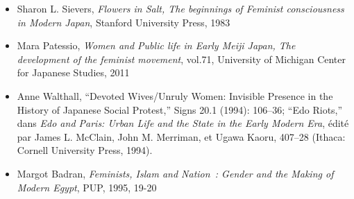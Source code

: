 \documentclass[11pt,a4paper]{article}
\begin{document}
\begin{itemize}[leftmargin=1.3em,itemsep=.18em,topsep=.25em]
\item
  Sharon L. Sievers, \emph{Flowers in Salt, The beginnings of Feminist consciousness in Modern Japan}, Stanford University Press, 1983
\item
  Mara Patessio, \emph{Women and Public life in Early Meiji Japan, The development of the feminist movement}, vol.71, University of Michigan Center for Japanese Studies, 2011
\item
  Anne Walthall, “Devoted Wives/Unruly Women: Invisible Presence in the History of Japanese Social Protest,” Signs 20.1 (1994): 106–36; “Edo Riots,” dans \emph{Edo and Paris: Urban Life and the State in the Early Modern Era}, édité par James L. McClain, John M. Merriman, et Ugawa Kaoru, 407–28 (Ithaca: Cornell University Press, 1994).
\item
  Margot Badran, \emph{Feminists, Islam and Nation~: Gender and the Making of Modern Egypt}, PUP, 1995, 19-20
\end{itemize}
\end{document}
